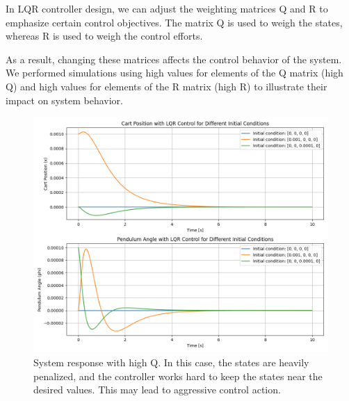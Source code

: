 \documentclass[11pt,twocolumn,twoside,lineno]{pnas-new}
\begin{document}
In LQR controller design, we can adjust the weighting matrices Q and R to emphasize certain control objectives. The matrix Q is used to weigh the states, whereas R is used to weigh the control efforts. 

As a result, changing these matrices affects the control behavior of the system. We performed simulations using high values for elements of the Q matrix (high Q) and high values for elements of the R matrix (high R) to illustrate their impact on system behavior.

\begin{figure}[ht]
    \centering
    \includegraphics[width=\linewidth]{simulations/high_q_rate.png}
    \caption{System response with high Q. In this case, the states are heavily penalized, and the controller works hard to keep the states near the desired values. This may lead to aggressive control action.}
    \label{fig:high_q}
\end{figure}
\end{document}
